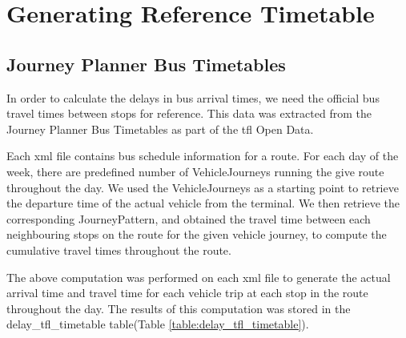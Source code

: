 \section{Generating Reference Timetable}
\subsection{Journey Planner Bus Timetables}
\label{sec: official_tfl_timetable}
\par In order to calculate the delays in bus arrival times, we need the official bus travel times between stops for reference. This data was extracted from the Journey Planner Bus Timetables\cite{open_data_feeds_description} as part of the \acrshort{tfl} Open Data.


\par Each xml file contains bus schedule information for a route. For each day of the week, there are predefined number of VehicleJourneys running the give route throughout the day. We used the VehicleJourneys as a starting point to retrieve the departure time of the actual vehicle from the terminal. We then retrieve the corresponding JourneyPattern, and obtained the travel time between each neighbouring stops on the route for the given vehicle journey, to compute the cumulative travel times throughout the route.

The above computation was performed on each xml file to generate the actual arrival time and travel time for each vehicle trip at each stop in the route throughout the day. The results of this computation was stored in the delay\_tfl\_timetable table(Table \ref{table:delay_tfl_timetable}).

